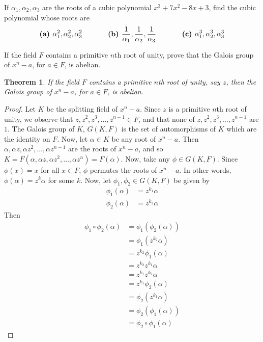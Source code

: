 \documentclass[12pt,leqno]{article}
\numberwithin{equation}{section}
\newcommand{\question}[2] {\vspace{.25in} \fbox{#1} #2 \vspace{.10in}}
\newtheorem*{Thm}{Theorem}
\theoremstyle{definition}
\begin{document}
\question{9}{If $\alpha_1,\alpha_2,\alpha_3$ are the roots of a cubic polynomial $x^3+7x^2-8x+3$, find the cubic polynomial whose roots are}
\[\textbf{(a) }\alpha_1^2,\alpha_2^2,\alpha_3^2\hskip.5in\textbf{(b) }\frac{1}{\alpha_1},\frac{1}{\alpha_2},\frac{1}{\alpha_3}\hskip.5in\textbf{(c) }\alpha_1^3,\alpha_2^3,\alpha_3^3\]

\question{18}{If the field $F$ contains a primitive $n$th root of unity, prove that the Galois group of $x^n-a$, for $a\in F$, is abelian.}

\begin{Thm}
 If the field $F$ contains a primitive $n$th root of unity, say $z$, then the Galois group of $x^n-a$, for $a\in F$, is abelian.
\end{Thm}

\begin{proof}
 Let $K$ be the splitting field of $x^n-a$. Since $z$ is a primitive $n$th root of unity, we observe that $z,z^2,z^3,\hdots,z^{n-1}\in F$, and that none of $z,z^2,z^3,\hdots,z^{n-1}$ are $1$. The Galois group of $K$, $G(K,F)$ is the set of automorphisms of $K$ which are the identity on $F$. Now, let $\alpha\in K$ be any root of $x^n-a$. Then $\alpha,\alpha z,\alpha z^2,\hdots,\alpha z^{n-1}$ are the roots of $x^n-a$, and so $K=F(\alpha,\alpha z,\alpha z^2,\hdots,\alpha z^n)=F(\alpha)$. Now, take any $\phi\in G(K,F)$. Since $\phi(x)=x$ for all $x\in F$, $\phi$ permutes the roots of $x^n-a$. In other words, $\phi(\alpha)=z^k\alpha$ for some $k$. Now, let $\phi_1,\phi_2\in G(K,F)$ be given by \begin{align*}\phi_1(\alpha)&=z^{k_1}\alpha\\\phi_2(\alpha)&=z^{k_2}\alpha\end{align*} Then \begin{align*}\phi_1\circ\phi_2(\alpha)&=\phi_1(\phi_2(\alpha))\\&=\phi_1(z^{k_2}\alpha)\\&=z^{k_2}\phi_1(\alpha)\\&=z^{k_2}z^{k_1}\alpha\\&=z^{k_1}z^{k_2}\alpha\\&=z^{k_1}\phi_2(\alpha)\\&=\phi_2(z^{k_1}\alpha)\\&=\phi_2(\phi_1(\alpha))\\&=\phi_2\circ\phi_1(\alpha)\end{align*}
\end{proof}
\end{document}

